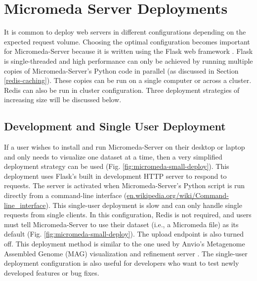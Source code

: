 \section{Micromeda Server Deployments} \label{micromeda-server-deployments}

It is common to deploy web servers in different configurations depending on the expected request volume. Choosing the optimal configuration becomes important for Micromeda-Server because it is written using the Flask web framework \cite{grinberg2018flask}. Flask is single-threaded and high performance can only be achieved by running multiple copies of Micromeda-Server's Python code in parallel (as discussed in Section \ref{redis-caching}). These copies can be run on a single computer or across a cluster. Redis can also be run in cluster configuration. Three deployment strategies of increasing size will be discussed below. 

\subsection{Development and Single User Deployment}

If a user wishes to install and run Micromeda-Server on their desktop or laptop and only needs to visualize one dataset at a time, then a very simplified deployment strategy can be used (Fig. \ref{fig:micromeda-small-deploy}). This deployment uses Flask's built in development HTTP server to respond to requests. The server is activated when Micromeda-Server's Python script is run directly from a command-line interface (\href{en.wikipedia.org/wiki/Command-line\_interface}{en.wikipedia.org/wiki/Command-line\_interface}). This single-user deployment is slow and can only handle single requests from single clients. In this configuration, Redis is not required, and users must tell Micromeda-Server to use their dataset (i.e., a Micromeda file) as its default (Fig. \ref{fig:micromeda-small-deploy}). The upload endpoint is also turned off. This deployment method is similar to the one used by Anvio's Metagenome Assembled Genome (MAG) visualization and refinement server \cite{eren2015anvi}. The single-user deployment configuration is also useful for developers who want to test newly developed features or bug fixes.

